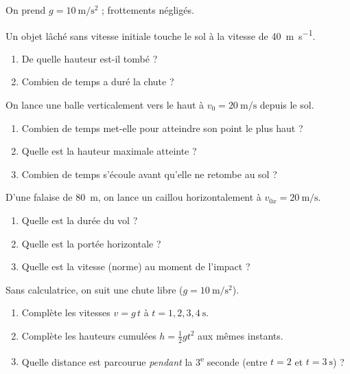 \documentclass[11pt,a4paper]{article}
\begin{document}
On prend $g=\qty{10}{\metre\per\second\squared}$ ; frottements négligés.

\begin{exo}
Un objet lâché sans vitesse initiale touche le sol à la vitesse de \qty{40}{\metre\per\second}.
\begin{enumerate}[label=\alph*)]
  \item De quelle hauteur est-il tombé ?
  \item Combien de temps a duré la chute ?
\end{enumerate}
\end{exo}

\begin{exo}
On lance une balle verticalement vers le haut à $v_0=\qty{20}{\metre\per\second}$ depuis le sol.
\begin{enumerate}[label=\alph*)]
  \item Combien de temps met-elle pour atteindre son point le plus haut ?
  \item Quelle est la hauteur maximale atteinte ?
  \item Combien de temps s'écoule avant qu'elle ne retombe au sol ?
\end{enumerate}
\end{exo}

\begin{exo}
D'une falaise de \qty{80}{\metre}, on lance un caillou horizontalement à $v_{0x}=\qty{20}{\metre\per\second}$.
\begin{enumerate}[label=\alph*)]
  \item Quelle est la durée du vol ?
  \item Quelle est la portée horizontale ?
  \item Quelle est la vitesse (norme) au moment de l'impact ?
\end{enumerate}
\end{exo}

\begin{exo}
Sans calculatrice, on suit une chute libre ($g=\qty{10}{\metre\per\second\squared}$).
\begin{enumerate}[label=\alph*)]
  \item Complète les vitesses $v=g\,t$ à $t=1,2,3,\qty{4}{\second}$.
  \item Complète les hauteurs cumulées $h=\tfrac12 g t^2$ aux mêmes instants.
  \item Quelle distance est parcourue \emph{pendant} la 3\textsuperscript{e} seconde (entre $t=2$ et $t=\qty{3}{\second}$) ?
\end{enumerate}
\end{exo}
\end{document}
